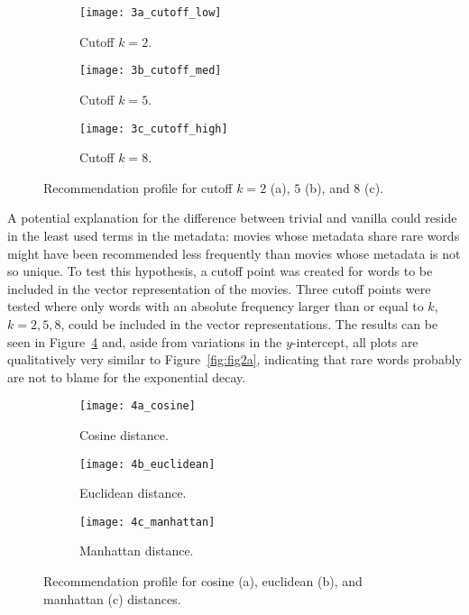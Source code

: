 \begin{figure}
  \centering
  \begin{subfigure}{0.3\textwidth}
    \centering
    \texttt{[image: 3a\_cutoff\_low]}
    \caption{Cutoff $k = 2$.\label{fig:fig3a}}
  \end{subfigure}
  \begin{subfigure}{0.3\textwidth}
    \centering
    \texttt{[image: 3b\_cutoff\_med]}
    \caption{Cutoff $k = 5$.\label{fig:fig3b}}
  \end{subfigure}
  \begin{subfigure}{0.3\textwidth}
    \centering
    \texttt{[image: 3c\_cutoff\_high]}
    \caption{Cutoff $k = 8$.\label{fig:fig3c}}
  \end{subfigure}
  \caption{Recommendation profile for cutoff $k = 2$ (a), $5$ (b), and $8$
    (c).\label{fig:fig3}}
\end{figure}

A potential explanation for the difference between trivial and vanilla could
reside in the least used terms in the metadata: movies whose metadata share rare
words might have been recommended less frequently than movies whose metadata is
not so unique. To test this hypothesis, a cutoff point was created for words to
be included in the vector representation of the movies. Three cutoff points were
tested where only words with an absolute frequency larger than or equal to $k$,
$k = {2, 5, 8}$, could be included in the vector representations. The results
can be seen in Figure~\ref{fig:fig3} and, aside from variations in the
$y$-intercept, all plots are qualitatively very similar to
Figure~\ref{fig:fig2a}, indicating that rare words probably are not to blame for
the exponential decay.

\begin{figure}
  \centering
  \begin{subfigure}{0.3\textwidth}
    \centering
    \texttt{[image: 4a\_cosine]}
    \caption{Cosine distance.\label{fig:fig4a}}
  \end{subfigure}
  \begin{subfigure}{0.3\textwidth}
    \centering
    \texttt{[image: 4b\_euclidean]}
    \caption{Euclidean distance.\label{fig:fig4b}}
  \end{subfigure}
  \begin{subfigure}{0.3\textwidth}
    \centering
    \texttt{[image: 4c\_manhattan]}
    \caption{Manhattan distance.\label{fig:fig4c}}
  \end{subfigure}
  \caption{Recommendation profile for cosine (a), euclidean (b), and manhattan
    (c) distances.\label{fig:fig4}}
\end{figure}

